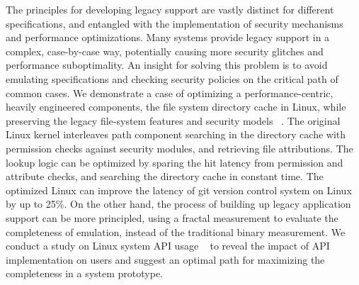 

The principles for developing legacy support are vastly distinct
for different specifications,
and entangled with the implementation of
security mechanisms and performance optimizations.
Many systems provide legacy support
in a complex, case-by-case way,
potentially causing more security glitches and performance suboptimality.
An insight
for solving this problem %
is to avoid
emulating specifications and checking security policies
on the critical path of common cases.
We demonstrate a case of optimizing a performance-centric, heavily engineered components,
the file system directory cache in Linux,
while preserving the legacy file-system features and security models
~\citep{tsai15dcache}.
The original Linux kernel interleaves path component searching
in the directory cache
with permission checks against security modules,
and retrieving file attributions.
The lookup logic can be optimized
by sparing the hit latency from permission and attribute checks,
and searching the directory cache in constant time.
The optimized Linux
can improve the latency of git version control system on Linux by up to 25\%.
On the other hand,
the process of building up legacy application support
can be more principled,
using a fractal measurement to evaluate the completeness of emulation,
instead of the traditional binary measurement.
%
We conduct a study on Linux system API usage
~\citep{tsai16apistudy}
to reveal the impact of API implementation on users
and suggest an optimal path for maximizing the completeness in a system prototype.


